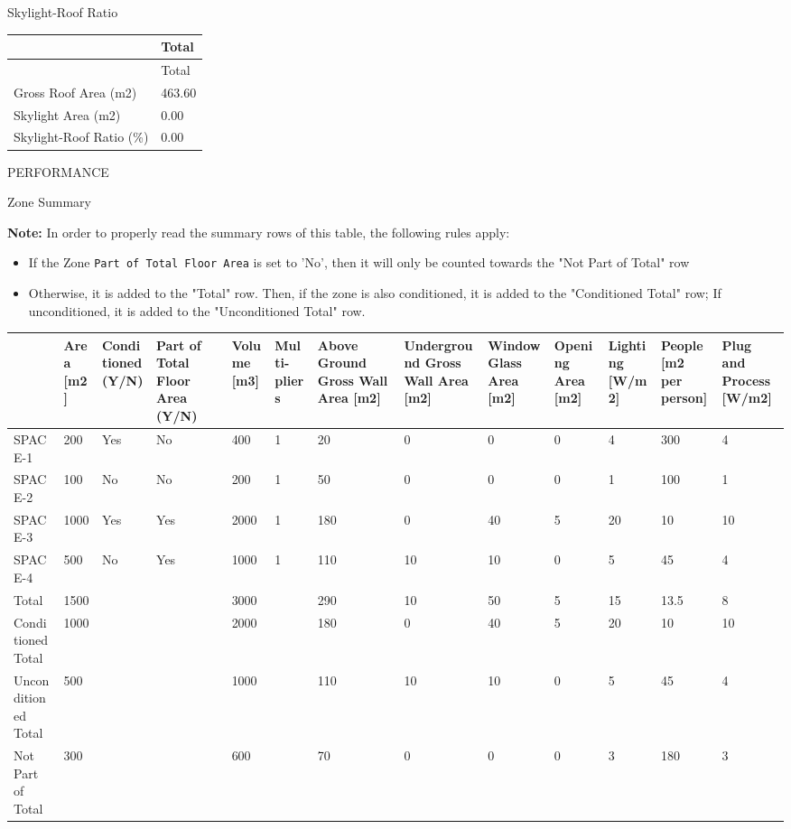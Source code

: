 Skylight-Roof Ratio

\begin{longtable}[c]{@{}ll@{}}
\toprule 
~ & Total \tabularnewline
\midrule
\endfirsthead

\toprule 
~ & Total \tabularnewline
\midrule
\endhead

Gross Roof Area (m2) & 463.60 \tabularnewline
Skylight Area (m2) & 0.00 \tabularnewline
Skylight-Roof Ratio (\%) & 0.00 \tabularnewline
\bottomrule
\end{longtable}

PERFORMANCE

Zone Summary

\textbf{Note:} In order to properly read the summary rows of this table, the following rules apply:

\begin{itemize}
    \item
        If the Zone \lstinline!Part of Total Floor Area! is set to 'No', then it will only be counted towards the "Not Part of Total" row
    \item
        Otherwise, it is added to the "Total" row. Then, if the zone is also conditioned, it is added to the "Conditioned Total" row;
        If unconditioned, it is added to the "Unconditioned Total" row.
\end{itemize}

{\tiny
\begin{longtable}[c]{|p{0.8in}|p{0.25in}|p{0.50in}|p{0.35in}|p{0.30in}|p{0.30in}|p{0.35in}|p{0.5in}|p{0.30in}|p{0.30in}|p{0.30in}|p{0.35in}|p{0.35in}|}
\hline
 & Area {[}m2{]} & Conditioned (Y/N) & Part of Total Floor Area (Y/N) & Volume {[}m3{]} & Multi-pliers & Above Ground Gross Wall Area {[}m2{]} & Underground Gross Wall Area {[}m2{]} & Window Glass Area {[}m2{]} & Opening Area {[}m2{]} & Lighting {[}W/m2{]} & People {[}m2 per person{]} & Plug and Process {[}W/m2{]} \\ \hline
\endhead
%
SPACE-1 & 200 & {\color{DarkGreen}Yes} & {\color{red}No} & 400 & 1 & 20 & 0 & 0 & 0 & 4 & 300 & 4 \\ \hline
SPACE-2 & 100 & {\color{red}No} & {\color{red}No} & 200 & 1 & 50 & 0 & 0 & 0 & 1 & 100 & 1 \\ \hline
SPACE-3 & 1000 & {\color{DarkGreen}Yes} & {\color{DarkGreen}Yes} & 2000 & 1 & 180 & 0 & 40 & 5 & 20 & 10 & 10 \\ \hline
SPACE-4 & 500 & {\color{red}No} & {\color{DarkGreen}Yes} & 1000 & 1 & 110 & 10 & 10 & 0 & 5 & 45 & 4 \\ \hline
Total & 1500 &  &  & 3000 &  & 290 & 10 & 50 & 5 & 15 & 13.5 & 8 \\ \hline
Conditioned Total & 1000 &  &  & 2000 &  & 180 & 0 & 40 & 5 & 20 & 10 & 10 \\ \hline
Unconditioned Total & 500 &  &  & 1000 &  & 110 & 10 & 10 & 0 & 5 & 45 & 4 \\ \hline
Not Part of Total & 300 &  &  & 600 &  & 70 & 0 & 0 & 0 & 3 & 180 & 3 \\ \hline
\end{longtable}
}

